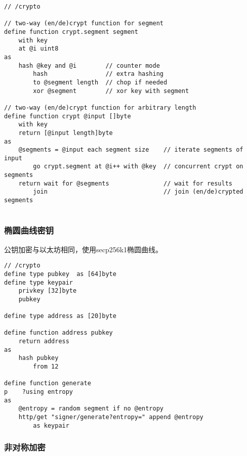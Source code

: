 \begin{definition}[Blockcipher]\label{def:crypt}
\begin{lstlisting}[language=buzz1]
// /crypto

// two-way (en/de)crypt function for segment
define function crypt.segment segment
    with key
    at @i uint8
as
    hash @key and @i        // counter mode 
        hash                // extra hashing
        to @segment length  // chop if needed
        xor @segment        // xor key with segment

// two-way (en/de)crypt function for arbitrary length 
define function crypt @input []byte
    with key
    return [@input length]byte
as
    @segments = @input each segment size    // iterate segments of input
        go crypt.segment at @i++ with @key  // concurrent crypt on segments
    return wait for @segments               // wait for results
        join                                // join (en/de)crypted segments
        
\end{lstlisting}
\end{definition}    

\subsubsection{椭圆曲线密钥}

公钥加密与以太坊相同，使用secp256k1椭圆曲线。  


\begin{definition}\label{def:ec-keys}
\begin{lstlisting}[language=buzz1]
// /crypto
define type pubkey  as [64]byte
define type keypair
    privkey [32]byte
    pubkey
    
define type address as [20]byte

define function address pubkey
    return address
as 
    hash pubkey 
        from 12

define function generate 
p    ?using entropy
as
    @entropy = random segment if no @entropy
    http/get "signer/generate?entropy=" append @entropy 
        as keypair

\end{lstlisting}
\end{definition}    

\subsubsection{非对称加密}

